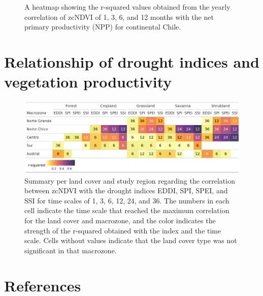 \documentclass[
  authoryear,
  preprint,
  3p,
  onecolumn]{elsarticle}
\begin{document}
\begin{figure}[!ht]


\caption{\label{fig-hetmap_npp_zcndvi}A heatmap showing the r-squared
values obtained from the yearly correlation of zcNDVI of 1, 3, 6, and 12
months with the net primary productivity (NPP) for continental Chile.}

\end{figure}%

\section{Relationship of drought indices and vegetation
productivity}\label{relationship-of-drought-indices-and-vegetation-productivity}

\begin{figure}[H]

{\centering \includegraphics[width=1\textwidth,height=\textheight]{../output/figs/tabla_r_cor_macro_indice.png}

}

\caption{Summary per land cover and study region regarding the
correlation between zcNDVI with the drought indices EDDI, SPI, SPEI, and
SSI for time scales of 1, 3, 6, 12, 24, and 36. The numbers in each cell
indicate the time scale that reached the maximum correlation for the
land cover and macrozone, and the color indicates the strength of the
r-squared obtained with the index and the time scale. Cells without
values indicate that the land cover type was not significant in that
macrozone.}

\end{figure}%

\newpage

\section*{References}\label{references}

\renewcommand{\bibsection}{}

\end{document}
